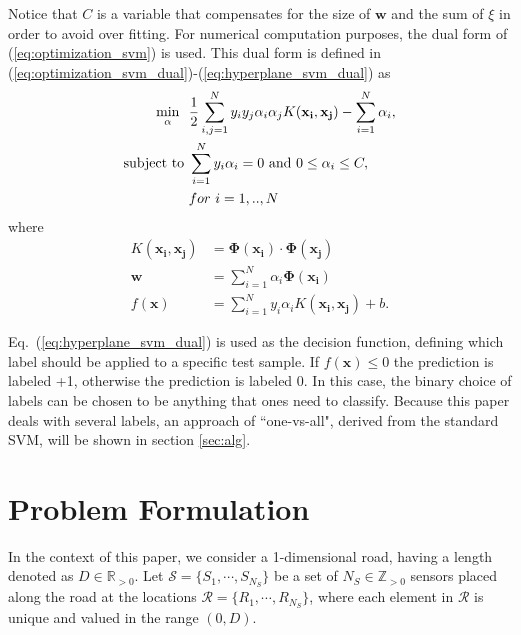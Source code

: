 \documentclass[letterpaper, 10 pt, conference]{ieeeconf}
\begin{document}
Notice that $C$ is a variable that compensates for the size of $\mathbf{w}$  and the sum of $\xi$ in order to avoid over fitting. For numerical computation purposes, the dual form of (\ref{eq:optimization_svm}) is used. This dual form is defined in (\ref{eq:optimization_svm_dual})-(\ref{eq:hyperplane_svm_dual}) as
\begin{align}
\min_{\alpha}~~ &\frac{1}{2} \sum_{i,j=1}^{N} y_i y_j \alpha_i \alpha_j K(\mathbf{x_i},\mathbf{x_j}) - \sum_{i=1}^{N} \alpha_i,\nonumber\\
\textup{subject to}~& \sum_{i=1}^{N} y_i \alpha_i = 0~\textup{and}~ 0\leq \alpha_i \leq C, ~\nonumber\\  &for~i=1,..,N\label{eq:optimization_svm_dual}
\end{align}
where
\begin{align}
K(\mathbf{x_i},\mathbf{x_j}) &= \mathbf{\Phi(x_i)}\cdot\mathbf{\Phi(x_j)}\label{eq:kernel_svm_dual}\\
\mathbf{w} &= \sum_{i=1}^{N} \alpha_i \mathbf{\Phi(x_i)}\label{eq:w_svm_dual}\\
f(\mathbf{x}) &= \sum_{i=1}^{N} y_i\alpha_i K(\mathbf{x_i},\mathbf{x_j}) + b.\label{eq:hyperplane_svm_dual}
\end{align}

Eq.~(\ref{eq:hyperplane_svm_dual}) is used as the decision function, defining which label should be applied to a specific test sample. If $f(\mathbf{x}) \leq 0$ the prediction is labeled +1, otherwise the prediction is labeled 0. In this case, the binary choice of labels can be chosen to be anything that ones need to classify.  Because this paper deals with several labels, an approach of ``one-vs-all", derived from the standard SVM, will be shown in section \ref{sec:alg}. 






\section{Problem Formulation}\label{sec:PF}

In the context of this paper, we consider a 1-dimensional road, having a length denoted as $D\in \mathbb{R}_{>0}$. Let $\mathcal{S}=\{S_1,\cdots,S_{N_S}\}$ be a set of $N_S\in \mathbb{Z}_{>0}$ sensors placed along the road at the locations $\mathcal{R}=\{R_1,\cdots,R_{N_S}\}$, where each element in $\mathcal{R}$ is unique and valued in the range $(0,D)$.
\end{document}
